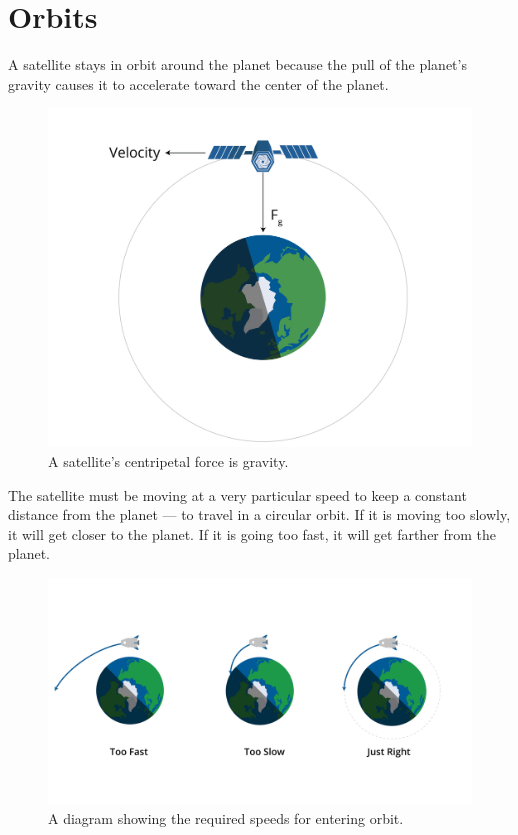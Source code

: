 \chapter{Orbits}

A satellite stays in orbit around the planet because the pull of the
planet's gravity causes it to accelerate toward the center of the
planet. 

\begin{figure}[htbp]
    \centering
    \includegraphics[width=.75\textwidth]{satellite.png}
    \caption{A satellite's centripetal force is gravity.}
    \label{fig:satellite}
\end{figure}


The satellite must be moving at a very particular speed to keep a
constant distance from the planet --- to travel in a circular orbit.
If it is moving too slowly, it will get closer to the planet.  If it
is going too fast, it will get farther from the planet.
\begin{figure}[htbp]
    \centering
    \includegraphics[width=.75\textwidth]{orbitSpeeds.png}
    \caption{A diagram showing the required speeds for entering orbit.}
    \label{fig:orbitSpeeds}
\end{figure}



